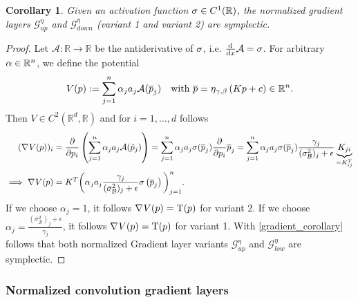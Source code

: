 \documentclass[twoside,a4paper]{article}
\newtheorem{corollary}{Corollary}
\begin{document}
\begin{corollary}\label{cor_norm_gradient_layers_symp}
	Given an activation function $\sigma \in C^1(\mathbb{R})$,
	the normalized gradient layers $\mathcal{G}^{\eta}_{up}$ and $\mathcal{G}^{\eta}_{down}$
	(variant 1 and variant 2) are symplectic.
\end{corollary}
\begin{proof}
	Let $\mathcal{A}: \mathbb{R} \to \mathbb{R}$ be the antiderivative of $\sigma$, 
	i.e. $\frac{\mathrm{d}^{}}{\mathrm{d}x} \mathcal{A} = \sigma$. For arbitrary $\alpha \in \mathbb{R}^n$, we define the potential
	\begin{equation*}
		V(p) := \sum_{j=1}^n \alpha_j a_j \mathcal{A}(\overline{p}_j)
		\quad \text{with } \overline{p} = \eta_{\gamma, \beta} \left( Kp + c \right) \in \mathbb{R}^n
		.
	\end{equation*}
	Then $V \in C^2(\mathbb{R}^d, \mathbb{R})$ and for $i=1, \dots, d$ follows
	\begin{align*}
		(\nabla_{}{V(p)})_i &= \frac{\partial }{\partial p_i} \left( \sum_{j=1}^n \alpha_j a_j \mathcal{A}(\hat{p}_j) \right)
		= \sum_{j=1}^n \alpha_j a_j \sigma(\overline{p}_j) \frac{\partial }{\partial p_i} \overline{p}_j
		= \sum_{j=1}^n \alpha_j a_j \sigma(\overline{p}_j)
		\frac{\gamma_j}{(\sigma^2_\mathcal{B})_j + \epsilon} \underbrace{K_{ji}}_{=K^T_{ij}} \\
		\implies
		\nabla_{}{V(p)}
		&= K^T \bigg( \alpha_j a_j \frac{\gamma_j}{(\sigma^2_\mathcal{B})_j + \epsilon}
		\sigma \left( \overline{p}_j \right) \bigg)_{j=1}^n
		.
	\end{align*}
	If we choose $\alpha_j = 1$, it follows $\nabla_{}{V(p)} = \mathrm{T}(p)$ for variant 2.
	If we choose $\alpha_j = \frac{(\sigma^2_\mathcal{B})_j + \epsilon}{\gamma_j}$,
	it follows $\nabla_{}{V(p)} = \mathrm{T}(p)$ for variant 1.
	With \cref{gradient_corollary} follows that both normalized Gradient layer variants
	$\mathcal{G}_{up}^\eta$ and $\mathcal{G}_{low}^\eta$ are symplectic.
\end{proof}

\subsubsection{Normalized convolution gradient layers}\label{sec_norm_conv_gradient_layer}
\end{document}
